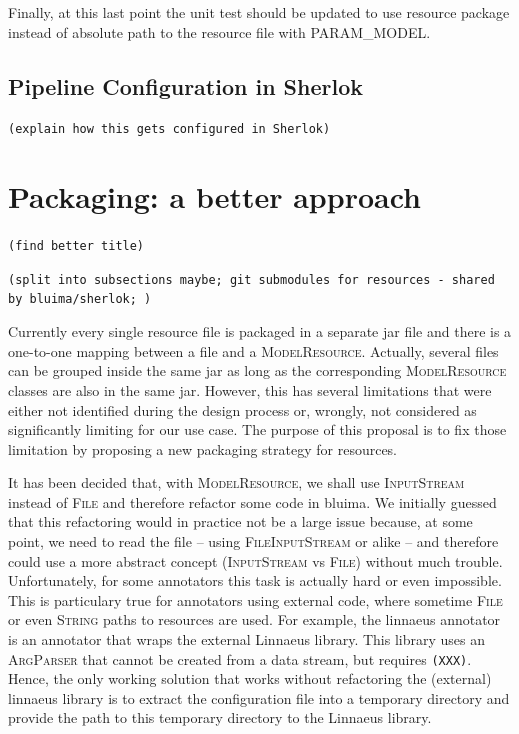 \documentclass{article}
\newcommand{\id}[1]{\mbox{\textsc{#1}}}
\newcommand{\TODO}[1]{\texttt{\textcolor{YellowOrange}{(#1)}}} %
\begin{document}
Finally, at this last point the unit test should be updated to use resource package instead of absolute path to the resource file with \id{PARAM\_MODEL}.

\subsection{Pipeline Configuration in Sherlok}

\TODO{explain how this gets configured in Sherlok}

\section{Packaging: a better approach}

\TODO{find better title}

\TODO{split into subsections maybe; git submodules for resources - shared by bluima/sherlok; }

Currently every single resource file is packaged in a separate jar file and there is a one-to-one mapping between a file and a \id{ModelResource}. Actually, several files can be grouped inside the same jar as long as the corresponding \id{ModelResource} classes are also in the same jar. However, this has several limitations that were either not identified during the design process or, wrongly, not considered as significantly limiting for our use case. The purpose of this proposal is to fix those limitation by proposing a new packaging strategy for resources.

It has been decided that, with \id{ModelResource}, we shall use \id{InputStream} instead of \id{File} and therefore refactor some code in bluima. We initially guessed that this refactoring would in practice not be a large issue because, at some point, we need to read the file -- using \id{FileInputStream} or alike -- and therefore could use a more abstract concept (\id{InputStream} vs \id{File}) without much trouble. Unfortunately, for some annotators this task is actually hard or even impossible. This is particulary true for annotators using external code, where sometime \id{File} or even \id{String} paths to resources are used. For example, the linnaeus annotator is an annotator that wraps the external Linnaeus library. This library uses an \id{ArgParser} that cannot be created from a data stream, but requires \TODO{XXX}. Hence, the only working solution that works without refactoring the (external) linnaeus library is to extract the configuration file into a temporary directory and provide the path to this temporary directory to the Linnaeus library.
\end{document}
